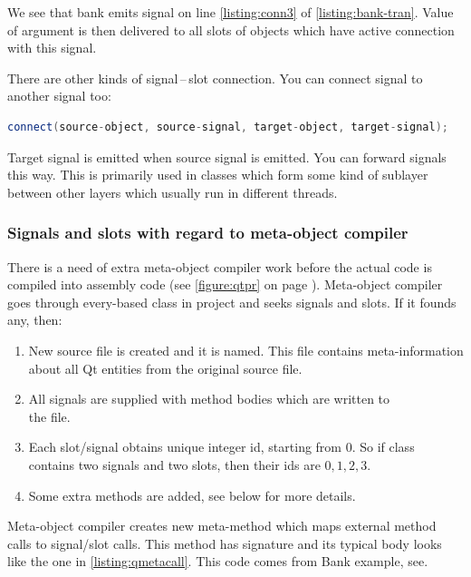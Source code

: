 We see that bank emits signal on line \ref{listing:conn3} of \autoref{listing:bank-tran}. Value of argument is then delivered to all slots of objects which have active connection with this signal.

There are other kinds of signal\,--\,slot connection. You can connect signal to another signal too:
\begin{lstlisting}[firstnumber=1,language=cpp]
connect(source-object, source-signal, target-object, target-signal);
\end{lstlisting}
Target signal is emitted when source signal is emitted. You can forward signals this way. This is primarily used in classes which form some kind of sublayer between other layers which usually run in different threads.

\subsubsection{Signals and slots with regard to meta-object compiler}\label{section:mocfun}
There is a need of extra meta-object compiler work before the actual \cpp{} code is compiled into assembly code (see \autoref{figure:qtpr} on page \pageref{figure:qtpr}). Meta-object compiler goes through every-based class in project and seeks signals and slots. If it founds any, then:
\begin{enumerate}
\item New source file is created and it is named. This file contains meta-information about all Qt entities from the original source file.
\item All signals are supplied with method bodies which are written to\\
the file.
\item Each slot/signal obtains unique integer id, starting from 0. So if class contains two signals and two slots, then their ids are $0,1,2,3$.
\item Some extra methods are added, see below for more details.
\end{enumerate}

Meta-object compiler creates new meta-method which maps external method calls to signal/slot calls. This method has signature and its typical body looks like the one in \autoref{listing:qmetacall}. This code comes from Bank example, see.

